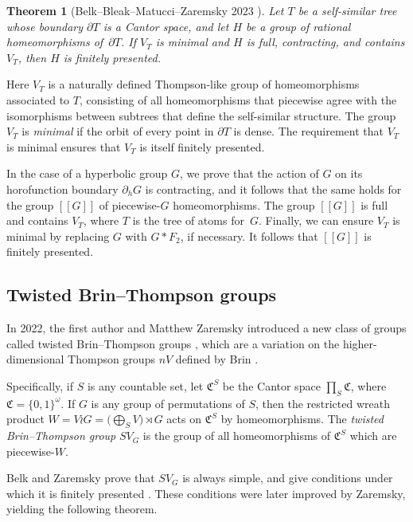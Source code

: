 \documentclass[usenames,dvipsnames]{amsart}
\newtheorem{theorem}{Theorem}[section]
\theoremstyle{definition}
\newcommand{\C}{\mathfrak{C}}
\begin{document}
\begin{theorem}[Belk--Bleak--Matucci--Zaremsky 2023 \cite{BelkBleakMatucciZaremsky}]\label{thm:FinitelyPresentedTheorem}
Let $T$ be a self-similar tree whose boundary $\partial T$ is a Cantor space, and let $H$ be a group of rational homeomorphisms of~$\partial T$.  If $V_T$ is minimal and $H$ is full, contracting, and contains $V_T$, then $H$ is finitely presented.
\end{theorem}

Here $V_T$ is a naturally defined Thompson-like group of homeomorphisms associated to $T$, consisting of all homeomorphisms that piecewise agree with the isomorphisms between subtrees that define the self-similar structure.  The group $V_T$ is \textit{minimal} if the orbit of every point in $\partial T$ is dense.  The requirement that $V_T$ is minimal ensures that $V_T$ is itself finitely presented.

In the case of a hyperbolic group $G$, we prove that the action of $G$ on its horofunction boundary $\partial_h G$ is contracting, and it follows that the same holds for the group $[[G]]$ of piecewise-$G$ homeomorphisms.  The group $[[G]]$ is full and contains $V_T$, where $T$ is the tree of atoms for~$G$.  Finally, we can ensure $V_T$ is minimal by replacing $G$ with $G*F_2$, if necessary. It follows that $[[G]]$ is finitely presented.
 
\subsection{Twisted Brin--Thompson groups} 

In 2022, the first author and Matthew Zaremsky introduced a new class of groups called twisted Brin--Thompson groups \cite{BelkZaremskyTwisted}, which are a variation on the higher-dimensional Thompson groups $nV$ defined by Brin \cite{BrinHigherV,BrinHigherVPresentations}. 

Specifically, if $S$ is any countable set, let $\C^S$ be the Cantor space $\prod_S \C$, where $\C=\{0,1\}^\omega$.  If $G$ is any group of permutations of $S$, then the restricted wreath product $W = V\wr G = \bigl(\bigoplus_{S} V)\rtimes G$ acts on $\C^S$ by homeomorphisms.   The \textit{twisted Brin--Thompson group} $SV_G$ is the group of all homeomorphisms of $\C^S$ which are piecewise-$W$. 

Belk and Zaremsky prove that $SV_G$ is always simple, and give conditions under which it is finitely presented \cite{BelkZaremskyTwisted}.  These conditions were later improved by Zaremsky, yielding the following theorem.
\end{document}
